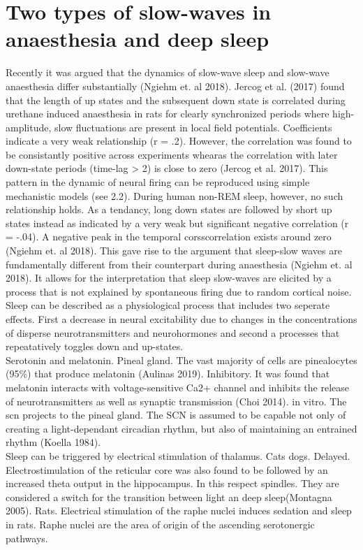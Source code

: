 \section{Two types of slow-waves in anaesthesia and deep sleep}

Recently it was argued that the dynamics of slow-wave sleep and slow-wave anaesthesia differ substantially (Ngiehm et. al 2018). Jercog et al. (2017) found that the length of up states and the subsequent down state is correlated during urethane induced anaesthesia in rats for clearly synchronized periods where high-amplitude, slow fluctuations are present in local field potentials. Coefficients indicate a very weak relationship (r = .2). However, the correlation was found to be consistantly positive across experiments whearas the correlation with later down-state periods (time-lag > 2) is close to zero (Jercog et al. 2017). This pattern in the dynamic of neural firing can be reproduced using simple mechanistic models (see 2.2). During human non-REM sleep, however, no such relationship holds. As a tendancy, long down states are followed by short up states instead as indicated by a very weak but significant negative correlation (r = -.04). A negative peak in the temporal corsscorrelation exists around zero (Ngiehm et. al 2018). This gave rise to the argument that sleep-slow waves are fundamentally different from their counterpart during anaesthesia (Ngiehm et. al 2018). It allows for the interpretation that sleep slow-waves are elicited by a process that is not explained by spontaneous firing due to random cortical noise.\\
Sleep can be described as a physiological process that includes two seperate effects. First a decrease in neural excitability due to changes in the concentrations of disperse neurotransmitters and neurohormones and second a processes that repeatatively toggles down and up-states.\\
Serotonin and melatonin. Pineal gland. The vast majority of cells are pinealocytes (95\%) that produce melatonin (Aulinas 2019). Inhibitory. It was found that melatonin interacts with voltage-sensitive Ca2+ channel and inhibits the release of neurotransmitters as well as synaptic transmission (Choi 2014). in vitro. The scn projects to the pineal gland. The SCN is assumed to be capable not only of creating a light-dependant circadian rhythm, but also of maintaining an entrained rhythm (Koella 1984).  
\\
Sleep can be triggered by electrical stimulation of thalamus. Cats dogs. Delayed.
Electrostimulation of the reticular core was also found to be followed by an increased theta output in the hippocampus. In this respect spindles. They are considered a switch for the transition between light an deep sleep(Montagna 2005).
Rats. Electrical stimulation of the raphe nuclei induces sedation and sleep in rats. Raphe nuclei are the area of origin of the ascending serotonergic pathways.\\

